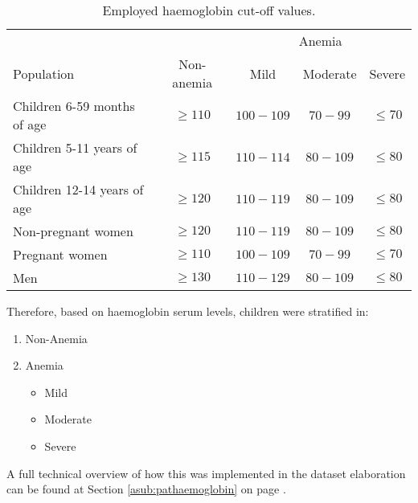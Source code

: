 \begin{table}[H]
   \centering
   \begin{tabular}{l c c c c}
   	  & & \multicolumn{3}{c}{Anemia}\footnotemark[1]\\
   	 \cline{3-5}
      Population & Non-anemia\footnotemark[1] & Mild\footnotemark[2] & Moderate & Severe\\
      \hline
      Children 6-59 months of age & $\geqslant 110$ & $100-109$ & $70-99$ & $\leqslant 70$\\
      Children 5-11 years of age & $\geqslant115$ & $110-114$ & $80-109$ & $\leqslant 80$\\
      Children 12-14 years of age & $\geqslant120$ & $110-119$ & $80-109$ & $\leqslant 80$\\
      Non-pregnant women & $\geqslant120$ & $110-119$ & $80-109$ & $\leqslant 80$\\
      Pregnant women & $\geqslant110$ & $100-109$ & $70-99$ & $\leqslant 70$\\
      Men & $\geqslant130$ & $110-129$ & $80-109$ & $\leqslant 80$\\
   \end{tabular}
   \caption{Employed haemoglobin cut-off values.}
    \label{tab:cutoffhaemo}
\end{table}

Therefore, based on haemoglobin serum levels, children were stratified in:
\begin{enumerate}
	\item Non-Anemia
	\item Anemia
	\begin{itemize}
		\item Mild
		\item Moderate\footnotemark[2]
		\item Severe
	\end{itemize}
\end{enumerate}


A full technical overview of how this was implemented in the dataset elaboration can be found at Section \ref{asub:pathaemoglobin} on page \pageref{asub:pathaemoglobin}.

